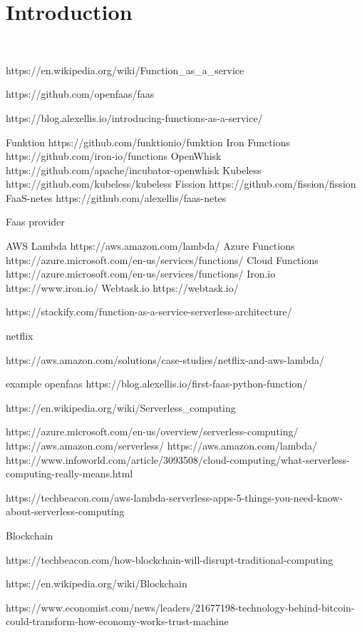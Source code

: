 
\chapter{Introduction}
\FILENAME\



https://en.wikipedia.org/wiki/Function_as_a_service

https://github.com/openfaas/faas

https://blog.alexellis.io/introducing-functions-as-a-service/


Funktion  https://github.com/funktionio/funktion
Iron Functions https://github.com/iron-io/functions
OpenWhisk https://github.com/apache/incubator-openwhisk
Kubeless https://github.com/kubeless/kubeless
Fission https://github.com/fission/fission
FaaS-netes https://github.com/alexellis/faas-netes

Faas provider

AWS Lambda https://aws.amazon.com/lambda/
Azure Functions https://azure.microsoft.com/en-us/services/functions/
Cloud Functions https://azure.microsoft.com/en-us/services/functions/
Iron.io https://www.iron.io/
Webtask.io https://webtask.io/



https://stackify.com/function-as-a-service-serverless-architecture/

netflix

https://aws.amazon.com/solutions/case-studies/netflix-and-aws-lambda/


example openfaas
https://blog.alexellis.io/first-faas-python-function/

https://en.wikipedia.org/wiki/Serverless_computing


https://azure.microsoft.com/en-us/overview/serverless-computing/
https://aws.amazon.com/serverless/
https://aws.amazon.com/lambda/
https://www.infoworld.com/article/3093508/cloud-computing/what-serverless-computing-really-means.html

https://techbeacon.com/aws-lambda-serverless-apps-5-things-you-need-know-about-serverless-computing


Blockchain

https://techbeacon.com/how-blockchain-will-disrupt-traditional-computing

https://en.wikipedia.org/wiki/Blockchain

https://www.economist.com/news/leaders/21677198-technology-behind-bitcoin-could-transform-how-economy-works-trust-machine